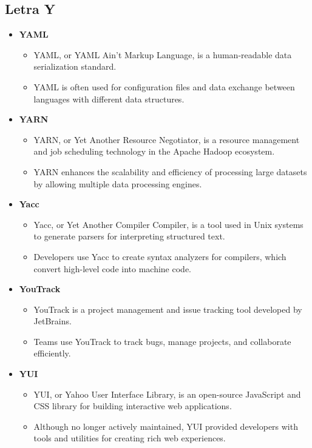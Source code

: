     \subsection{Letra Y}
    \begin{itemize}
        \item \textbf{YAML}
        \begin{itemize}
            \item YAML, or YAML Ain't Markup Language, is a human-readable data serialization standard.
            \item YAML is often used for configuration files and data exchange between languages with different data structures.
        \end{itemize}
        \item \textbf{YARN}
        \begin{itemize}
            \item YARN, or Yet Another Resource Negotiator, is a resource management and job scheduling technology in the Apache Hadoop ecosystem.
            \item YARN enhances the scalability and efficiency of processing large datasets by allowing multiple data processing engines.
        \end{itemize}
        \item \textbf{Yacc}
        \begin{itemize}
            \item Yacc, or Yet Another Compiler Compiler, is a tool used in Unix systems to generate parsers for interpreting structured text.
            \item Developers use Yacc to create syntax analyzers for compilers, which convert high-level code into machine code.
        \end{itemize}
        \item \textbf{YouTrack}
        \begin{itemize}
            \item YouTrack is a project management and issue tracking tool developed by JetBrains.
            \item Teams use YouTrack to track bugs, manage projects, and collaborate efficiently.
        \end{itemize}
        \item \textbf{YUI}
        \begin{itemize}
            \item YUI, or Yahoo User Interface Library, is an open-source JavaScript and CSS library for building interactive web applications.
            \item Although no longer actively maintained, YUI provided developers with tools and utilities for creating rich web experiences.
        \end{itemize}
    \end{itemize}
